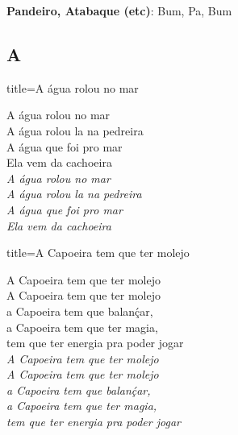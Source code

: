 \documentclass[fontsize=14pt, paper=a4, twoside, DIV=20]{scrreprt} %
\newcommand\chapTOC[1]{
    \chapter*{#1}
    \addcontentsline{toc}{chapter}{#1}
    \markboth{#1}{#1}}
\begin{document}
\textbf{Pandeiro, Atabaque (etc)}: Bum, Pa, Bum
\newpage

\begin{multicols*}{2}
\chapTOC{A}

\begin{song}{title={A água rolou no mar}}
        \begin{verse*}
                A água rolou no mar\\
                A água rolou la na pedreira\\
                A água que foi pro mar\\
                Ela vem da cachoeira \\

                \textit{A água rolou no mar\\
                A água rolou la na pedreira\\
                A água que foi pro mar\\
                Ela vem da cachoeira \\}
        \end{verse*}
\end{song}

\begin{song}{title={A Capoeira tem que ter molejo}}
\begin{verse*}
A Capoeira tem que ter molejo \\
A Capoeira tem que ter molejo \\
a Capoeira tem que balanḉar,\\
a Capoeira tem que ter magia,\\
tem que ter energia pra poder jogar\\

    \textit{A Capoeira tem que ter molejo \\
    A Capoeira tem que ter molejo \\
    a Capoeira tem que balanḉar, \\
    a Capoeira tem que ter magia, \\
    tem que ter energia pra poder jogar \\}
\end{verse*}
\end{song}


\end{multicols*}
\end{document}
